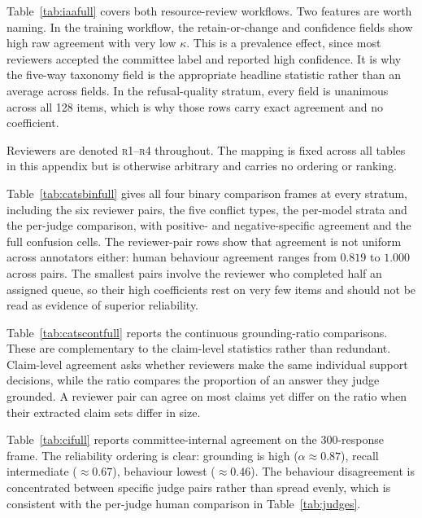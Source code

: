 

\FloatBarrier

Table~\ref{tab:iaafull} covers both resource-review workflows. Two features are
worth naming. In the training workflow, the retain-or-change and confidence
fields show high raw agreement with very low $\kappa$. This is a prevalence
effect, since most reviewers accepted the committee label and reported high
confidence. It is why the five-way taxonomy field is the appropriate headline
statistic rather than an average across fields. In the refusal-quality stratum,
every field is unanimous across all 128 items, which is why those rows carry
exact agreement and no coefficient.

Reviewers are denoted \textsc{r1}--\textsc{r4} throughout. The mapping is fixed
across all tables in this appendix but is otherwise arbitrary and carries no
ordering or ranking.



\FloatBarrier

Table~\ref{tab:catsbinfull} gives all four binary comparison frames at every
stratum, including the six reviewer pairs, the five conflict types, the per-model
strata and the per-judge comparison, with positive- and negative-specific
agreement and the full confusion cells. The reviewer-pair rows show that
agreement is not uniform across annotators either: human behaviour agreement
ranges from $0.819$ to $1.000$ across pairs. The smallest pairs involve the
reviewer who completed half an assigned queue, so their high coefficients rest on
very few items and should not be read as evidence of superior reliability.



\FloatBarrier

Table~\ref{tab:catscontfull} reports the continuous grounding-ratio comparisons.
These are complementary to the claim-level statistics rather than redundant.
Claim-level agreement asks whether reviewers make the same individual support
decisions, while the ratio compares the proportion of an answer they judge
grounded. A reviewer pair can agree on most claims yet differ on the ratio when
their extracted claim sets differ in size.



\FloatBarrier

Table~\ref{tab:cifull} reports committee-internal agreement on the
300-response frame. The reliability ordering is clear: grounding is high
($\alpha \approx 0.87$), recall intermediate ($\approx 0.67$), behaviour lowest
($\approx 0.46$). The behaviour disagreement is concentrated between specific
judge pairs rather than spread evenly, which is consistent with the per-judge
human comparison in Table~\ref{tab:judges}.

